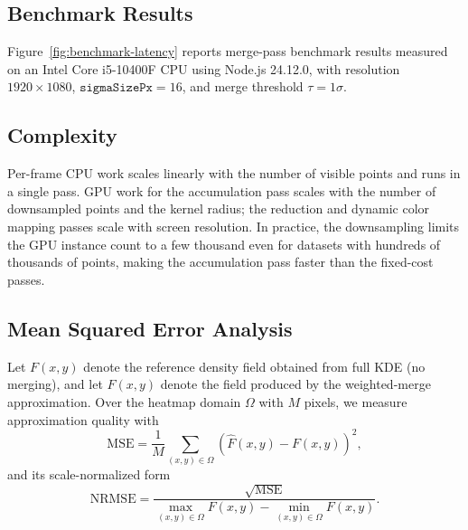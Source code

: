 \documentclass[10pt,conference]{IEEEtran}
\begin{document}
\label{sec:results}


\subsection{Benchmark Results}

Figure~\ref{fig:benchmark-latency} reports merge-pass benchmark results measured on an Intel Core i5-10400F CPU using Node.js 24.12.0, with resolution $1920\times1080$, $\texttt{sigmaSizePx}=16$, and merge threshold $\tau=1\sigma$.


\subsection{Complexity}

Per-frame CPU work scales linearly with the number of visible points and runs in a single pass. GPU work for the accumulation pass scales with the number of downsampled points and the kernel radius; the reduction and dynamic color mapping passes scale with screen resolution. In practice, the downsampling limits the GPU instance count to a few thousand even for datasets with hundreds of thousands of points, making the accumulation pass faster than the fixed-cost passes.

\subsection{Mean Squared Error Analysis}

Let $F(x,y)$ denote the reference density field obtained from full KDE (no merging), and let $\hat{F}(x,y)$ denote the field produced by the weighted-merge approximation. Over the heatmap domain $\Omega$ with $M$ pixels, we measure approximation quality with
\begin{equation}
\mathrm{MSE}=\frac{1}{M}\sum_{(x,y)\in\Omega}\left(\hat{F}(x,y)-F(x,y)\right)^2,
\end{equation}
and its scale-normalized form
\begin{equation}
\mathrm{NRMSE}=\frac{\sqrt{\mathrm{MSE}}}{\max_{(x,y)\in\Omega}F(x,y)-\min_{(x,y)\in\Omega}F(x,y)}.
\end{equation}
\end{document}
